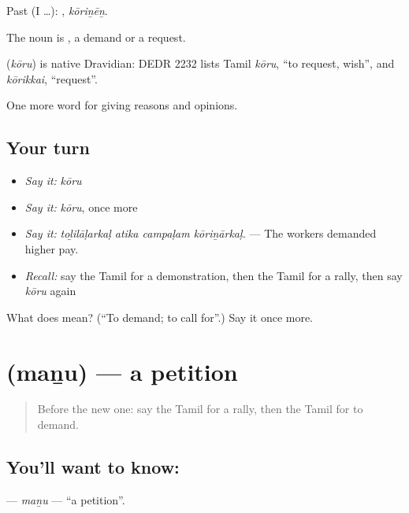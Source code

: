 Past (I …): , \emph{kōriṉēṉ}.

The noun is , a demand or a request.

\begin{cousinweb}
\textbf{} (\emph{kōru}) is native Dravidian: DEDR 2232 lists Tamil \emph{kōru}, \textquotedblleft{}to request, wish\textquotedblright{}, and \emph{kōrikkai}, \textquotedblleft{}request\textquotedblright{}.
\end{cousinweb}

\begin{grammarlens}[title={What you've built}]
One more word for giving reasons and opinions.
\end{grammarlens}

\subsection*{Your turn}
\begin{itemize}
\raggedright
  \item \emph{Say it:} \emph{kōru}
  \item \emph{Say it:} \emph{kōru}, once more
  \item \emph{Say it:} \emph{toḻilāḷarkaḷ atika campaḷam kōriṉārkaḷ.} — The workers demanded higher pay.
  \item \emph{Recall:} say the Tamil for a demonstration, then the Tamil for a rally, then say \emph{kōru} again
\end{itemize}

\begin{tcolorbox}[breakable,colback=teal!4,colframe=teal!35!black,title={Before you move on}]
What does  mean? (\textquotedblleft{}To demand; to call for\textquotedblright{}.) Say it once more.
\end{tcolorbox}
\section[\texorpdfstring{\ta{மனு} (maṉu)}{மனு (maṉu)}]{ (maṉu) — a petition}

\label{lesson:TA-C376-manu}



\begin{quote}
Before the new one: say the Tamil for a rally, then the Tamil for to demand.
\end{quote}

\subsection*{You'll want to know: }
\textbf{} — \emph{maṉu} — \textquotedblleft{}a petition\textquotedblright{}.

